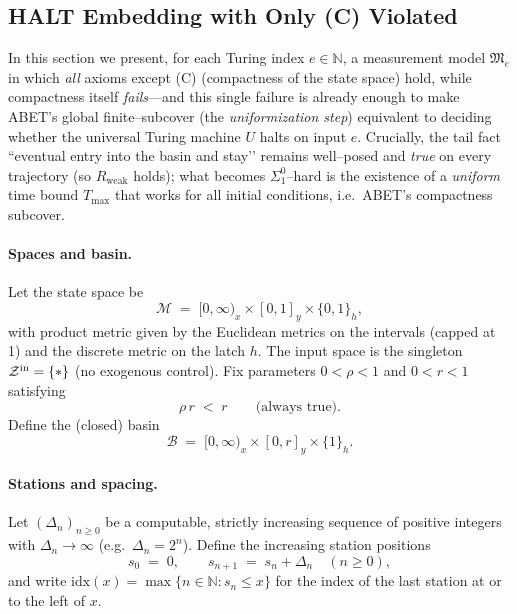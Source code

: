 \documentclass[12pt]{article}
\theoremstyle{definition}
\theoremstyle{plain}
\begin{document}
\subsection{HALT Embedding with Only (C) Violated}
\label{sec:C-only-violation-abet}

In this section we present, for each Turing index \(e\in\mathbb N\), a measurement
model \(\mathfrak M_e\) in which \emph{all} axioms except \textup{(C)} (compactness
of the state space) hold, while compactness itself \emph{fails}—and this single
failure is already enough to make ABET’s global finite–subcover (the
\emph{uniformization step}) equivalent to deciding whether the universal Turing
machine \(U\) halts on input \(e\).
Crucially, the tail fact “eventual entry into the basin and stay’’ remains
well–posed and \emph{true} on every trajectory (so \(R_{\text{weak}}\) holds);
what becomes \(\Sigma^0_1\)–hard is the existence of a \emph{uniform} time bound
\(T_{\max}\) that works for all initial conditions, i.e.\ ABET’s compactness
subcover.

\paragraph{Spaces and basin.}
Let the state space be
\[
  \mathcal M \;=\; [0,\infty)_x \times [0,1]_y \times \{0,1\}_h,
\]
with product metric given by the Euclidean metrics on the intervals (capped at
1) and the discrete metric on the latch \(h\).  The input space is the singleton
\(\mathcal Z^{\rm in}=\{\ast\}\) (no exogenous control).
Fix parameters \(0<\rho<1\) and \(0<r<1\) satisfying
\begin{equation}
\label{eq:rho-r-choice}
  \rho\,r \;<\; r \qquad\text{(always true)}.
\end{equation}
Define the (closed) basin
\[
  \mathcal B \;=\; [0,\infty)_x \times [0,r]_y \times \{1\}_h.
\]

\paragraph{Stations and spacing.}
Let \((\Delta_n)_{n\ge0}\) be a computable, strictly increasing sequence of positive
integers with \(\Delta_n\to\infty\) (e.g.\ \(\Delta_n=2^n\)).
Define the increasing station positions
\[
  s_0 \;=\; 0,\qquad s_{n+1} \;=\; s_n + \Delta_n \quad(n\ge0),
\]
and write \(\mathrm{idx}(x)=\max\{n\in\mathbb N: s_n\le x\}\) for the index of the
last station at or to the left of \(x\).
\end{document}
